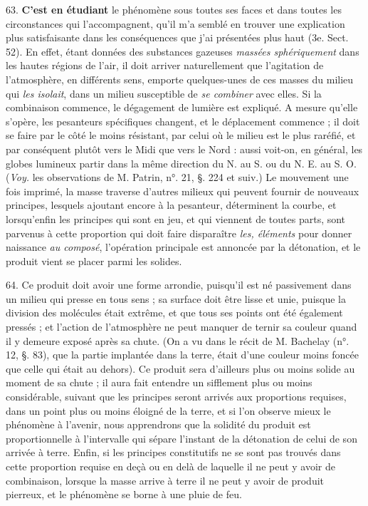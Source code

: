 \documentclass[a4paper, 11pt, oneside, polutonikogreek, french]{article}
\begin{document}
63. \textbf{C'est en étudiant} le phénomène sous toutes ses faces et dans toutes les circonstances qui l'accompagnent, qu'il m'a semblé en trouver une explication plus satisfaisante dans les conséquences que j'ai présentées plus haut (3e. Sect. 52). En effet, étant données des substances gazeuses \emph{massées sphériquement} dans les hautes régions de l'air, il doit arriver naturellement que l'agitation de l'atmosphère, en différents sens, emporte quelques-unes de ces masses du milieu qui \emph{les isolait}, dans un milieu susceptible de \emph{se combiner} avec elles. Si la combinaison commence, le dégagement de lumière est expliqué. A mesure qu'elle s'opère, les pesanteurs spécifiques changent, et le déplacement commence ; il doit se faire par le côté le moins résistant, par celui où le milieu est le plus raréfié, et par conséquent plutôt vers le Midi que vers le Nord : aussi voit-on, en général, les globes lumineux partir dans la même direction du N. au S. ou du N. E. au S. O. (\emph{Voy.} les observations de M. Patrin, n°. 21, §. 224 et suiv.) Le mouvement une fois imprimé, la masse traverse d'autres milieux qui peuvent fournir de nouveaux principes, lesquels ajoutant encore à la pesanteur, déterminent la courbe, et lorsqu'enfin les principes qui sont en jeu, et qui viennent de toutes parts, sont parvenus à cette proportion qui doit faire disparaître \emph{les, éléments} pour donner naissance \emph{au composé}, l'opération principale est annoncée par la détonation, et le produit vient se placer parmi les solides.

64. Ce produit doit avoir une forme arrondie, puisqu'il est né passivement dans un milieu qui presse en tous sens ; sa surface doit être lisse et unie, puisque la division des molécules était extrême, et que tous ses points ont été également pressés ; et l'action de l'atmosphère ne peut manquer de ternir sa couleur quand il y demeure exposé après sa chute. (On a vu dans le récit de M. Bachelay (n°. 12, §. 83), que la partie implantée dans la terre, était d'une couleur moins foncée que celle qui était au dehors). Ce produit sera d'ailleurs plus ou moins solide au moment de sa chute ; il aura fait entendre un sifflement plus ou moins considérable, suivant que les principes seront arrivés aux proportions requises, dans un point plus ou moins éloigné de la terre, et si l'on observe mieux le phénomène à l'avenir, nous apprendrons que la solidité du produit est proportionnelle à l'intervalle qui sépare l'instant de la détonation de celui de son arrivée à terre. Enfin, si les principes constitutifs ne se sont pas trouvés dans cette proportion requise en deçà ou en delà de laquelle il ne peut y avoir de combinaison, lorsque la masse arrive à terre il ne peut y avoir de produit pierreux, et le phénomène se borne à une pluie de feu.
\end{document}
